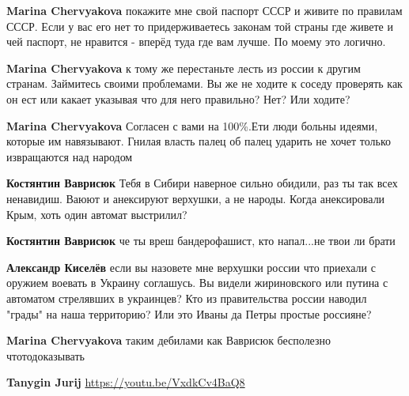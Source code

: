 \begin{itemize}
\begin{itemize}
\textbf{Marina Chervyakova} покажите мне свой паспорт СССР и живите по правилам СССР. Если у вас его нет то придерживаетесь законам той страны где живете и чей паспорт, не нравится - вперёд туда где вам лучше. По моему это логично.




\textbf{Marina Chervyakova} к тому же перестаньте
лесть из россии к другим странам. Займитесь своими проблемами. Вы же не ходите
к соседу проверять как он ест или какает указывая что для него правильно? Нет?
Или ходите?



\textbf{Marina Chervyakova} Согласен с вами на 100\%.Ети люди больны идеями,
которые им навязывают. Гнилая власть палец об палец ударить не хочет только
извращаются над народом



\textbf{Костянтин Ваврисюк} Тебя в Сибири наверное сильно обидили, раз ты так
всех ненавидиш. Ваюют и анексируют верхушки, а не народы. Когда анексировали
Крым, хоть один автомат выстрилил?



\textbf{Костянтин Ваврисюк} че ты вреш бандерофашист, кто напал...не твои ли
брати 🤔



\textbf{Александр Киселёв} если вы назовете мне верхушки россии что приехали с
оружием воевать в Украину соглашусь. Вы видели жириновского или путина с
автоматом стрелявших в украинцев? Кто из правительства россии наводил "грады"
на наша территорию? Или это Иваны да Петры простые россияне?

\textbf{Marina Chervyakova} таким дебилами как Ваврисюк бесполезно чтотодоказывать

\textbf{Tanygin Jurij} \url{https://youtu.be/VxdkCv4BaQ8}


\end{itemize}
\end{itemize}
